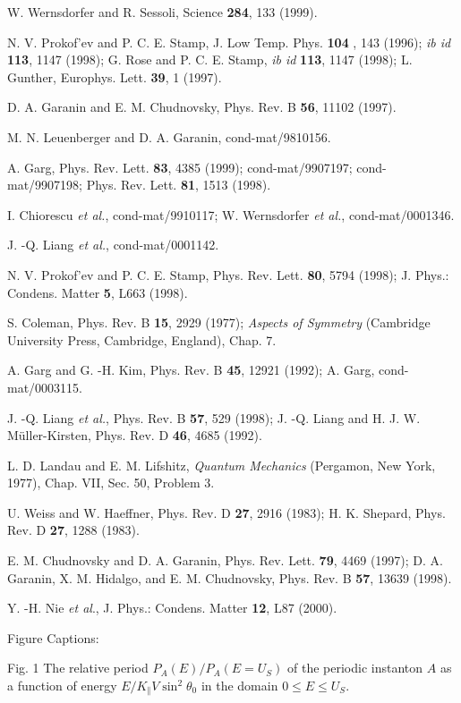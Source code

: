 \begin{references}
  W. Wernsdorfer and R. Sessoli, Science {\bf 284}\-, 133 (1999).

  N. V. Prokof'ev and P. C. E. Stamp, J. Low Temp. Phys. {\bf 104%
}, 143 (1996); {\it ib id }{\bf 113}, 1147 (1998); G. Rose and P. C. E.
Stamp, {\it ib id }{\bf 113}, 1147 (1998); L. Gunther, Europhys. Lett. {\bf %
39}, 1 (1997).

  D. A. Garanin and E. M. Chudnovsky, Phys. Rev. B {\bf 56},
11102 (1997).

  M. N. Leuenberger and D. A. Garanin, cond-mat/9810156.

  A. Garg, Phys. Rev. Lett. {\bf 83}, 4385 (1999);
cond-mat/9907197; cond-mat/9907198; Phys. Rev. Lett. {\bf 81}, 1513 (1998).

  I. Chiorescu {\it et al.}, cond-mat/9910117; W. Wernsdorfer 
{\it et al.}, cond-mat/0001346.

  J. -Q. Liang {\it et al.}, cond-mat/0001142.

  N. V. Prokof'ev and P. C. E. Stamp, Phys. Rev. Lett. {\bf 80},
5794 (1998); J. Phys.: Condens. Matter {\bf 5}, L663 (1998).

  S. Coleman, Phys. Rev. B {\bf 15}, 2929 (1977); {\it Aspects
of Symmetry} (Cambridge University Press, Cambridge, England), Chap. 7.

  A. Garg and G. -H. Kim, Phys. Rev. B {\bf 45}, 12921 (1992);
A. Garg, cond-mat/0003115.

  J. -Q. Liang {\it et al.}, Phys. Rev. B {\bf 57}, 529 (1998);
J. -Q. Liang and H. J. W. M\"{u}ller-Kirsten, Phys. Rev. D {\bf 46}, 4685
(1992).

  L. D. Landau and E. M. Lifshitz, {\it Quantum Mechanics}
(Pergamon, New York, 1977), Chap. VII, Sec. 50, Problem 3.

  U. Weiss and W. Haeffner, Phys. Rev. D {\bf 27}, 2916 (1983);
H. K. Shepard, Phys. Rev. D {\bf 27}, 1288 (1983).

  E. M. Chudnovsky and D. A. Garanin, Phys. Rev. Lett. {\bf 79},
4469 (1997); D. A. Garanin, X. M. Hidalgo, and E. M. Chudnovsky, Phys. Rev.
B {\bf 57}, 13639 (1998).

  Y. -H. Nie {\it et al}., J. Phys.: Condens. Matter {\bf 12},
L87 (2000).

Figure Captions:

Fig. 1 The relative period $P_A\left( E\right) /P_A\left( E=U_S\right) $ of
the periodic instanton $A$ as a function of energy $E/K_{\Vert }V\sin
^2\theta _0$ in the domain $0\leq E\leq U_S$.


\end{references}
